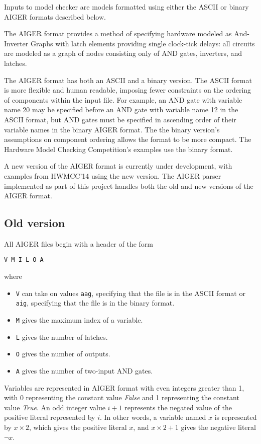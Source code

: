 \documentclass[12pt,a4paper,twoside,openright]{report}
\begin{document}
Inputs to model checker are models formatted using either the ASCII or
binary AIGER formats described below.

The AIGER format provides a method of specifying hardware modeled as
And-Inverter Graphs with latch elements providing single clock-tick
delays: all circuits are modeled as a graph of nodes consisting only of
AND gates, inverters, and latches.

The AIGER format has both an ASCII and a binary version. The ASCII
format is more flexible and human readable, imposing fewer constraints
on the ordering of components within the input file. For example, an
AND gate with variable name 20 may be specified before an AND gate with
variable name 12 in the ASCII format, but AND gates must be specified in
ascending order of their variable names in the binary AIGER format.
The the binary version's assumptions on component ordering allows the format
to be more compact. The Hardware Model Checking Competition's examples
use the binary format.

A new version of the AIGER format is currently under development, with
examples from HWMCC'14 using the new version. The AIGER parser implemented
as part of this project handles both the old and new versions of the AIGER
format.

\subsection{Old version}

All AIGER files begin with a header of the form
\begin{verbatim}
V M I L O A
\end{verbatim}
where
\begin{itemize}
\item \verb,V, can take on values \verb,aag,, specifying that the file is in the ASCII format or \verb,aig,,
specifying that the file is in the binary format.
\item \verb,M, gives the maximum index of a variable.
\item \verb,L, gives the number of latches.
\item \verb,O, gives the number of outputs.
\item \verb,A, gives the number of two-input AND gates.
\end{itemize}

Variables are represented in AIGER format with even integers greater than
1, with 0 representing the constant value {\it False} and 1
representing the constant value {\it True}.
An odd integer value $i + 1$ represents the negated value of the positive
literal represented by $i$.
In other words, a variable named $x$ is represented by $x \times 2$,
which gives the positive literal $x$, and $x \times 2 + 1$ gives the
negative literal $\neg x$.
\end{document}
